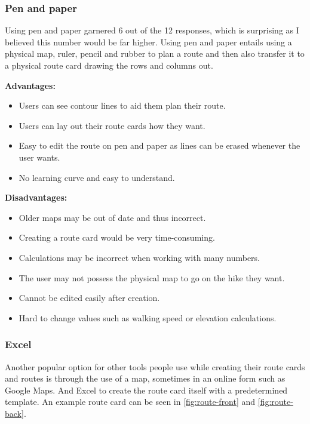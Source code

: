\documentclass{article}
\newcommand{\Adv}{\bigskip\textbf{Advantages: }}
\newcommand{\Dis}{\bigskip\textbf{Disadvantages: }}
\begin{document}
        \subsubsection{Pen and paper}

            Using pen and paper garnered 6 out of the 12 responses, which is surprising as I believed this number would be far higher. Using pen and paper entails using a physical map, ruler, pencil and rubber to plan a route and then also transfer it to a physical route card drawing the rows and columns out.

            \Adv
            \begin{itemize}
                \item Users can see contour lines to aid them plan their route.
                \item Users can lay out their route cards how they want.
                \item Easy to edit the route on pen and paper as lines can be erased whenever the user wants.
                \item No learning curve and easy to understand.
            \end{itemize}

            \Dis
            \begin{itemize}
                \item Older maps may be out of date and thus incorrect.
                \item Creating a route card would be very time-consuming.
                \item Calculations may be incorrect when working with many numbers.
                \item The user may not possess the physical map to go on the hike they want.
                \item Cannot be edited easily after creation.
                \item Hard to change values such as walking speed or elevation calculations.
            \end{itemize}

        \subsubsection{Excel}

            Another popular option for other tools people use while creating their route cards and routes is through the use of a map, sometimes in an online form such as Google Maps. And Excel to create the route card itself with a predetermined template. An example route card can be seen in \cref{fig:route-front} and \cref{fig:route-back}.
\end{document}

